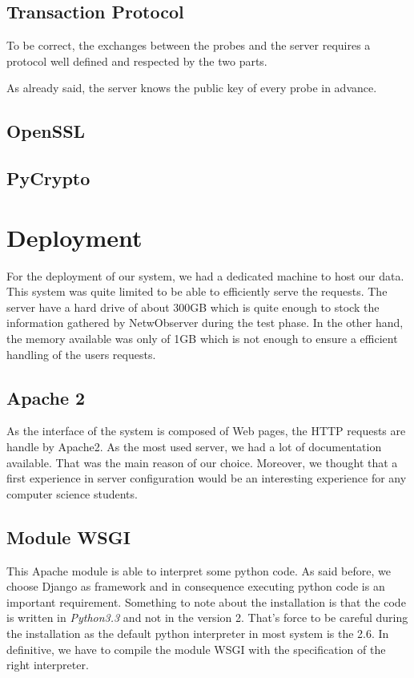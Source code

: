 \subsection{Transaction Protocol}
To be correct, the exchanges between the probes and the server requires a protocol well defined and respected by the two parts. 



As already said, the server knows the public key of every probe in advance. 



\subsection{OpenSSL}

\subsection{PyCrypto}

\section{Deployment}
For the deployment of our system, we had a dedicated machine to host our data. This system was quite limited to be able to efficiently serve the requests. The server have a hard drive of about 300GB which is quite enough to stock the information gathered by NetwObserver during the test phase. In the other hand, the memory available was only of 1GB which is not enough to ensure a efficient handling of the users requests.

\subsection{Apache 2}
As the interface of the system is composed of Web pages, the HTTP requests are handle by Apache2. As the most used server, we had a lot of documentation available. That was the main reason of our choice. Moreover, we thought that a first experience in server configuration would be an interesting experience for any computer science students.

\subsection{Module WSGI}
This Apache module is able to interpret some python code. As said before, we choose Django as framework and in consequence executing python code is an important requirement. Something to note about the installation is that the code is written in \emph{Python3.3} and not in the version 2. That's force to be careful during the installation as the default python interpreter in most system is the 2.6. In definitive, we have to compile the module WSGI with the specification of the right interpreter.

